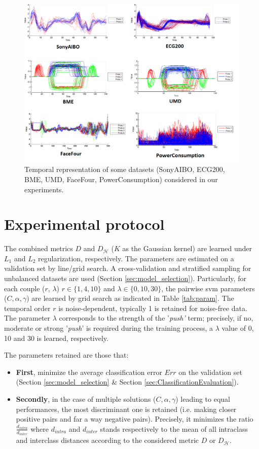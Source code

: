 \begin{figure}[h!]
	\centering
	\includegraphics[width=0.85\linewidth]{images/dataset_exp}
	\caption{Temporal representation of some datasets (SonyAIBO, ECG200, BME, UMD, FaceFour, PowerConsumption) considered in our experiments.}
	\label{fig:dataset}
\end{figure}

\newpage
\section{Experimental protocol}
The combined metrics  $D$ and $D_{\mathcal{H}}$  ($K$ as the Gaussian kernel) are learned under $L_1$ and $L_2$ regularization, respectively. The parameters are estimated on a validation set by line/grid search.  A cross-validation and  stratified sampling for unbalanced datasets are used (Section \ref{sec:model_selection}).  Particularly, for each  couple ($r$, $\lambda$) $r \in \{1, 4, 10\}$ and $\lambda \in \{0, 10, 30\}$, the pairwise {\sc svm} parameters ($C,\alpha, \gamma$) are learned by grid search as indicated in Table \ref{tab:param}. The temporal order $r$ is noise-dependent,  typically 1  is retained for noise-free data. The parameter $\lambda$ corresponds to the strength of the '{\it push'} term; precisely, if  no, moderate or  strong '{\it push}'  is required during the training process, a $\lambda$ value of  0, 10 and 30 is learned, respectively.

\noindent The parameters retained are those that:
\begin{itemize}
	\item \textbf{First}, minimize the average classification error $Err$ on  the validation set (Section \ref{sec:model_selection} \& Section \ref{sec:ClassificationEvaluation}).
	\item \textbf{Secondly}, in the case of multiple solutions ($C,\alpha, \gamma$)  leading to equal performances, the most discriminant one is retained (i.e. making closer positive pairs and far a way negative pairs). Precisely, it minimizes the ratio $\frac{d_{intra}}{d_{inter}}$ where $d_{intra}$ and $d_{inter}$ stands respectively to the mean of all intraclass and interclass distances according to the considered metric $D$ or $D_{\mathcal{H}}$.
\end{itemize} 

